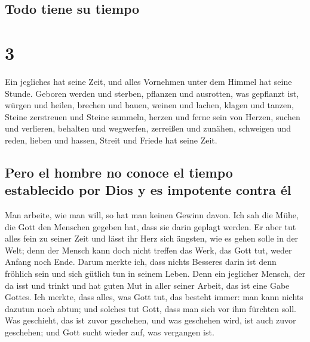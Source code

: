 \hypertarget{todo-tiene-su-tiempo}{%
\subsection{Todo tiene su tiempo}\label{todo-tiene-su-tiempo}}

\hypertarget{section-2}{%
\section{3}\label{section-2}}

 Ein jegliches hat seine Zeit, und alles Vornehmen unter
dem Himmel hat seine Stunde.  Geboren werden und sterben,
pflanzen und ausrotten, was gepflanzt ist,  würgen und
heilen, brechen und bauen,  weinen und lachen, klagen und
tanzen,  Steine zerstreuen und Steine sammeln, herzen und
ferne sein von Herzen,  suchen und verlieren, behalten und
wegwerfen,  zerreißen und zunähen, schweigen und reden,
 lieben und hassen, Streit und Friede hat seine Zeit.

\hypertarget{pero-el-hombre-no-conoce-el-tiempo-establecido-por-dios-y-es-impotente-contra-uxe9l}{%
\subsection{Pero el hombre no conoce el tiempo establecido por Dios y es
impotente contra
él}\label{pero-el-hombre-no-conoce-el-tiempo-establecido-por-dios-y-es-impotente-contra-uxe9l}}

 Man arbeite, wie man will, so hat man keinen Gewinn
davon.  Ich sah die Mühe, die Gott den Menschen gegeben
hat, dass sie darin geplagt werden.  Er aber tut alles
fein zu seiner Zeit und lässt ihr Herz sich ängsten, wie es gehen solle
in der Welt; denn der Mensch kann doch nicht treffen das Werk, das Gott
tut, weder Anfang noch Ende.  Darum merkte ich, dass
nichts Besseres darin ist denn fröhlich sein und sich gütlich tun in
seinem Leben.  Denn ein jeglicher Mensch, der da isst und
trinkt und hat guten Mut in aller seiner Arbeit, das ist eine Gabe
Gottes.  Ich merkte, dass alles, was Gott tut, das
besteht immer: man kann nichts dazutun noch abtun; und solches tut Gott,
dass man sich vor ihm fürchten soll.  Was geschieht, das
ist zuvor geschehen, und was geschehen wird, ist auch zuvor geschehen;
und Gott sucht wieder auf, was vergangen ist.

